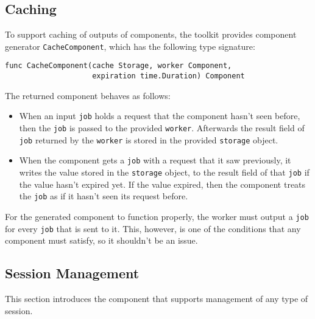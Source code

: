 \subsection{Caching}
To support caching of outputs of components, the toolkit provides
component generator \texttt{CacheComponent}, which has the following type
signature:
\begin{lstlisting}
func CacheComponent(cache Storage, worker Component, 
                    expiration time.Duration) Component
\end{lstlisting}
The returned component behaves as follows:
\begin{itemize}
  \item When an input \texttt{job} holds a request that the component 
        hasn't seen before, then the \texttt{job} is passed to the 
        provided \texttt{worker}. Afterwards the result field of \texttt{job}
        returned by the \texttt{worker} is stored in the provided 
        \texttt{storage} object.

  \item When the component gets a \texttt{job} with a request that it saw 
        previously, it writes the value stored in the \texttt{storage} object,
        to the result field of that \texttt{job} if the value hasn't expired yet. 
        If the value expired, then the component treats the \texttt{job} as if it
        hasn't seen its request before.
\end{itemize}

For the generated component to function properly, the worker must output
a \texttt{job} for every \texttt{job} that is sent to it. This, however, 
is one of the conditions that any component must satisfy, so it shouldn't 
be an issue.

\subsection{Session Management}
This section introduces the component that supports management of any
type of session.
